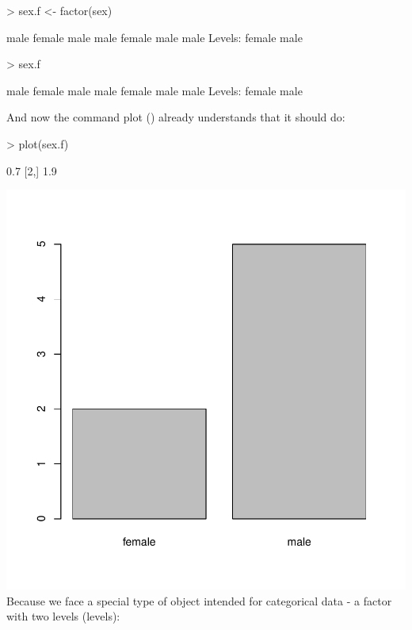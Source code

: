 \documentclass[a4paper,11pt]{scrartcl}
\begin{document}
\begin{Schunk}
\begin{Sinput}
> sex.f <- factor(sex)
\end{Sinput}
\begin{Soutput}
[1] male   female male   male   female male   male  
Levels: female male
\end{Soutput}
\begin{Sinput}
> sex.f
\end{Sinput}
\begin{Soutput}
[1] male   female male   male   female male   male  
Levels: female male
\end{Soutput}
\end{Schunk}
And now the command plot () already understands that it should do:
\begin{Schunk}
\begin{Sinput}
> plot(sex.f)
\end{Sinput}
\begin{Soutput}
     [,1]
[1,]  0.7
[2,]  1.9
\end{Soutput}
\end{Schunk}
\includegraphics{r3-009}
Because we face a special type of object intended for categorical data - a factor with two levels (levels):
\end{document}
